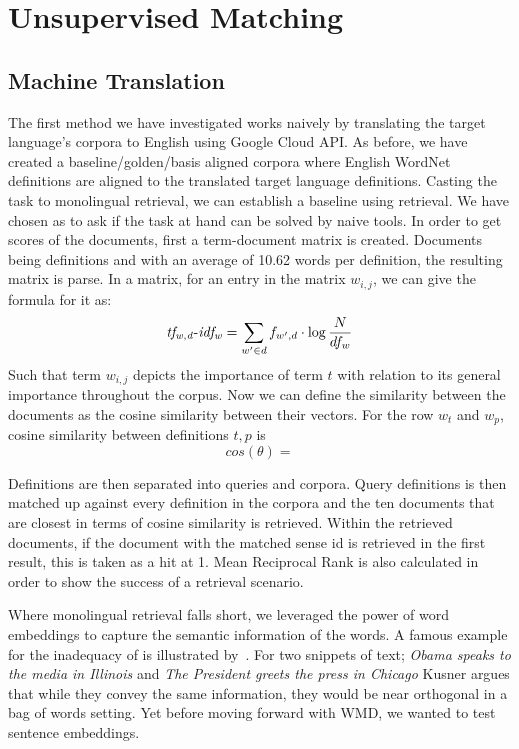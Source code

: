 \chapter{Unsupervised Matching}
\label{chap:unsupervised_matching}

\section{Machine Translation}

The first method we have investigated works naively by translating the target language's corpora to English using Google Cloud API\@. %
As before, we have created a baseline/golden/basis aligned corpora where English WordNet definitions are aligned to the translated target language definitions.
Casting the task to monolingual retrieval, we can establish a baseline using \tfidf{} retrieval.
We have chosen \tfidf{} as to ask if the task at hand can be solved by naive tools.
In order to get \tfidf{} scores of the documents, first a term-document matrix is created.
Documents being definitions and with an average of 10.62 words per definition, the resulting matrix is parse.
In a \tfidf{} matrix, for an entry in the matrix $w_{i,j}$, we can give the formula for it as:
\begin{equation*}
    {\operatorname{\mathit{tf_{w,d}-idf_{w}}}} = {\sum_{w' \in d}{f_{w',d}}} \cdot \log \frac {N} {df_w}
\end{equation*}
Such that term $w_{i,j}$ depicts the importance of term $t$ with relation to its general importance throughout the corpus.
Now we can define the similarity between the documents as the cosine similarity between their \tfidf{} vectors.
For the row $w_t$ and $w_p$, cosine similarity between definitions $t, p$ is
\begin{equation*}
    cos(\theta) =
\end{equation*}

Definitions are then separated into queries and corpora.
Query definitions is then matched up against every definition in the corpora and the ten documents that are closest in terms of cosine similarity is retrieved.
Within the retrieved documents, if the document with the matched sense id is retrieved in the first result, this is taken as a hit at 1.
Mean Reciprocal Rank is also calculated in order to show the success of a retrieval scenario.

Where monolingual retrieval falls short, we leveraged the power of word embeddings to capture the semantic information of the words.
A famous example for the inadequacy of \tfidf{} is illustrated by~\cite{kusner_word_2015}.
For two snippets of text; \emph{Obama speaks to the media in Illinois} and \emph{The President greets the press in Chicago} Kusner argues that while they convey the same information, they would be near orthogonal in a bag of words setting.
Yet before moving forward with WMD, we wanted to test sentence embeddings.

